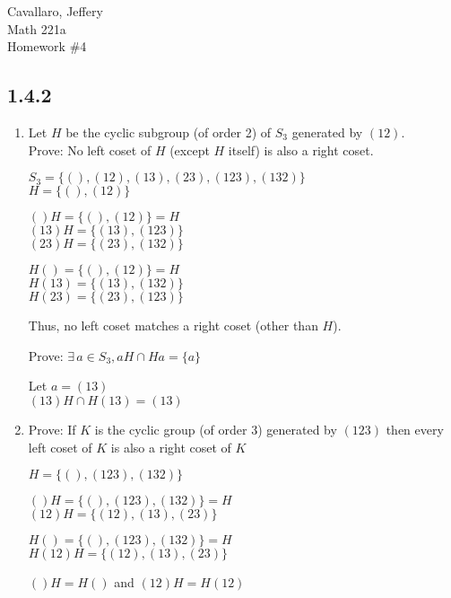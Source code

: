\documentclass[letterpaper,12pt,fleqn]{article}
\begin{document}
Cavallaro, Jeffery \\
Math 221a \\
Homework \#4

\bigskip

\subsection*{1.4.2}
\begin{enumerate}[label={\alph*)}]
\item Let $H$ be the cyclic subgroup (of order 2) of $S_3$ generated by
  $(12)$. \\
  Prove: No left coset of $H$ (except $H$ itself) is also a right coset.

  $S_3=\{(),(12),(13),(23),(123),(132)\}$ \\
  $H=\{(),(12)\}$

  \begin{minipage}[t]{2.5in}
    $()H=\{(),(12)\}=H$ \\
    $(13)H=\{(13),(123)\}$ \\
    $(23)H=\{(23),(132)\}$
  \end{minipage}
  \begin{minipage}[t]{2.5in}
    $H()=\{(),(12)\}=H$ \\
    $H(13)=\{(13),(132)\}$ \\
    $H(23)=\{(23),(123)\}$
  \end{minipage}

  Thus, no left coset matches a right coset (other than $H$).

  Prove: $\exists\,a\in S_3,aH\cap Ha=\{a\}$

  Let $a=(13)$ \\
  $(13)H\cap H(13)=(13)$

\item Prove: If $K$ is the cyclic group (of order 3) generated by $(123)$ then
  every left coset of $K$ is also a right coset of $K$

  $H=\{(),(123),(132)\}$
  
  \begin{minipage}[t]{3in}
    $()H=\{(),(123),(132)\}=H$ \\
    $(12)H=\{(12),(13),(23)\}$ \\
  \end{minipage}
  \begin{minipage}[t]{3in}
    $H()=\{(),(123),(132)\}=H$ \\
    $H(12)H=\{(12),(13),(23)\}$ \\
  \end{minipage}

  $()H=H()$ and $(12)H=H(12)$
\end{enumerate}
\end{document}
